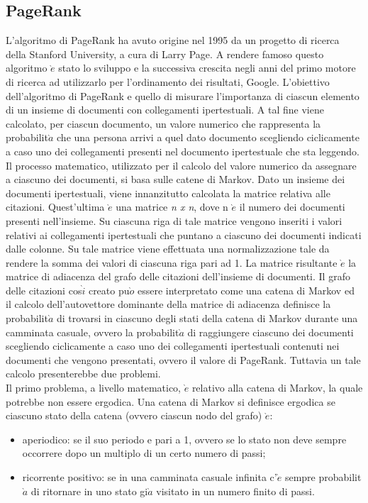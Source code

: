 \subsection{PageRank}
L'algoritmo di PageRank \cite{cit_45} ha avuto origine nel 1995 da un progetto di ricerca
della Stanford University, a cura di Larry Page. A rendere famoso questo
algoritmo $\grave{e}$ stato lo sviluppo e la successiva crescita negli anni del primo motore
di ricerca ad utilizzarlo per l'ordinamento dei risultati, Google. L'obiettivo
dell'algoritmo di PageRank e quello di misurare l'importanza di ciascun elemento
di un insieme di documenti con collegamenti ipertestuali. A tal fine
viene calcolato, per ciascun documento, un valore numerico che rappresenta la
probabilit$\grave{a}$ che una persona arrivi a quel dato documento scegliendo ciclicamente
a caso uno dei collegamenti presenti nel documento ipertestuale che sta
leggendo. Il processo matematico, utilizzato per il calcolo del valore numerico
da assegnare a ciascuno dei documenti, si basa sulle catene di Markov. Dato
un insieme dei documenti ipertestuali, viene innanzitutto calcolata la matrice
relativa alle citazioni. Quest'ultima $\grave{e}$ una matrice \textit{n x n}, dove n $\grave{e}$ il numero
dei documenti presenti nell'insieme. Su ciascuna riga di tale matrice vengono
inseriti i valori relativi ai collegamenti ipertestuali che puntano a ciascuno dei
documenti indicati dalle colonne. Su tale matrice viene effettuata una normalizzazione
tale da rendere la somma dei valori di ciascuna riga pari ad 1. La
matrice risultante $\grave{e}$ la matrice di adiacenza del grafo delle citazioni dell'insieme
di documenti.
Il grafo delle citazioni cos$\grave{i}$ creato pu$\grave{o}$ essere interpretato come una catena
di Markov ed il calcolo dell'autovettore dominante della matrice di adiacenza
definisce la probabilit$\grave{a}$ di trovarsi in ciascuno degli stati della catena di Markov
durante una camminata casuale, ovvero la probabilit$\grave{a}$ di raggiungere ciascuno
dei documenti scegliendo ciclicamente a caso uno dei collegamenti ipertestuali
contenuti nei documenti che vengono presentati, ovvero il valore di PageRank.
Tuttavia un tale calcolo presenterebbe due problemi.\\
Il primo problema, a livello matematico, $\grave{e}$ relativo alla catena di Markov, la
quale potrebbe non essere ergodica. Una catena di Markov si definisce ergodica
se ciascuno stato della catena (ovvero ciascun nodo del grafo) $\grave{e}$:
\begin{itemize}
\item aperiodico: se il suo periodo e pari a 1, ovvero se lo stato non deve sempre
occorrere dopo un multiplo di un certo numero di passi;
\item ricorrente positivo: se in una camminata casuale infinita c'$\grave{e}$ sempre
probabilit$\grave{a}$ di ritornare in uno stato gi$\grave{a}$ visitato in un numero finito
di passi.
\end{itemize}
